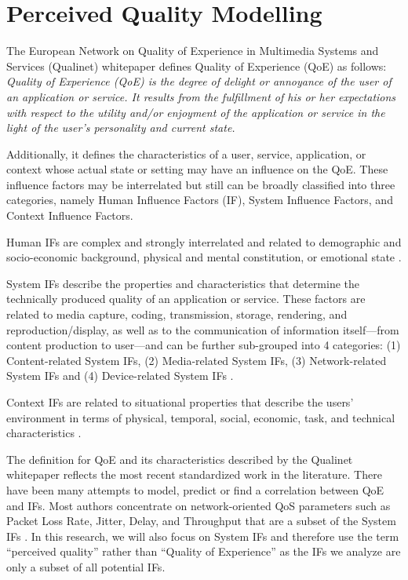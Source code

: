 \documentclass[journal]{IEEEtran}
\begin{document}
\section{Perceived Quality Modelling}
\label{sec:quality}

The European Network on Quality of Experience in Multimedia Systems and Services (Qualinet) whitepaper \cite{le2012qualinet} defines Quality of Experience (QoE) as follows:
\textit{Quality of Experience (QoE) is the degree of delight or annoyance of the user of an application or service. It results from the fulfillment of his or her expectations with respect to the utility and/or enjoyment of the application or service in the light of the user’s personality and current state.}

Additionally, it defines the characteristics of a user, service, application, or context whose actual state or setting may have an influence on the QoE. These influence factors may be interrelated but still can be broadly classified into three categories, namely Human Influence Factors (IF), System Influence Factors, and Context Influence Factors.

Human IFs are complex and strongly interrelated and related to demographic and socio-economic background, physical and mental constitution, or emotional state \cite{le2012qualinet}.

System IFs describe the properties and characteristics that determine the technically produced quality of an application or service. These factors are related to media capture, coding, transmission, storage, rendering, and reproduction/display, as well as to the communication of information itself—from content production to user—and can be further sub-grouped into 4 categories: (1) Content-related System IFs, (2) Media-related System IFs, (3) Network-related System IFs and (4) Device-related System IFs \cite{le2012qualinet}.

Context IFs are related to situational properties that describe the users' environment in terms of physical, temporal, social, economic, task, and technical characteristics \cite{le2012qualinet}.

The definition for QoE and its characteristics described by the Qualinet whitepaper reflects the most recent standardized work in the literature. There have been many attempts to model, predict or find a correlation between QoE and IFs. Most authors concentrate on network-oriented QoS parameters such as Packet Loss Rate, Jitter, Delay, and Throughput that are a subset of the System IFs \cite{maia2014concise} \cite{paudyal2014study}. In this research, we will also focus on System IFs and therefore use the term ``perceived quality'' rather than ``Quality of Experience'' as the IFs we analyze are only a subset of all potential IFs.
\end{document}
